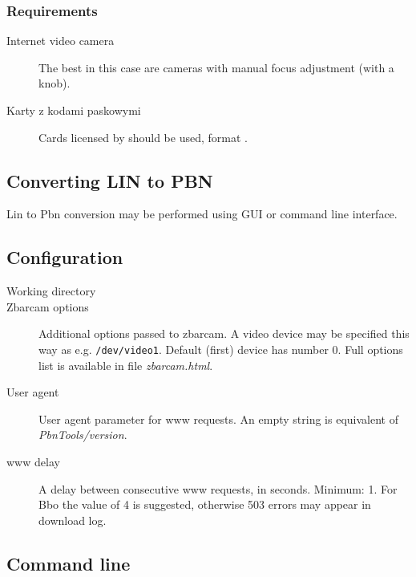 \documentclass[polish,a4paper,11pt,oneside]{article}
\begin{document}
\subsubsection{Requirements}
\begin{description}
\item[Internet video camera]
  The best in this case are cameras with manual focus adjustment (with a knob).
  
\item[Karty z kodami paskowymi]
  Cards licensed by 
  should be used, format .
\end{description}

\subsection{Converting LIN to PBN}

Lin to Pbn conversion may be performed using GUI or command line
interface.


\subsection{Configuration} \label{konfig} %

\begin{description}
\item[Working directory]
\item[Zbarcam options]
  Additional options passed to zbarcam.
  A video device may be specified this way as e.g. \verb!/dev/video1!.
  Default (first) device has number 0.
  Full options list is available in file {\em zbarcam.html}.
\item[User agent]
  User agent parameter for www requests. An empty string is equivalent of
  {\em PbnTools/version}.
\item[www delay]
  A delay between consecutive www requests, in seconds.
  Minimum: 1. For Bbo the value of 4 is suggested,
  otherwise 503 errors may appear in download log.

\end{description}


\subsection{Command line} \label{commLine} %
\end{document}
